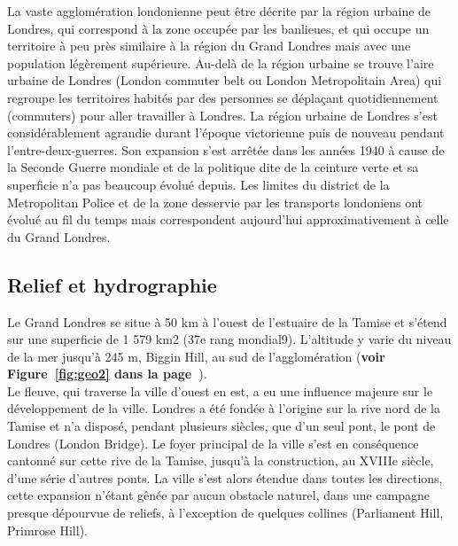 \documentclass{article}
\begin{document}
La vaste agglomération londonienne peut être décrite par la région urbaine de Londres, qui correspond à la zone occupée par les banlieues, et qui occupe un territoire à peu près similaire à la région du Grand Londres mais avec une population légèrement supérieure. Au-delà de la région urbaine se trouve l'aire urbaine de Londres (London commuter belt ou London Metropolitain Area) qui regroupe les territoires habités par des personnes se déplaçant quotidiennement (commuters) pour aller travailler à Londres. La région urbaine de Londres s'est considérablement agrandie durant l'époque victorienne puis de nouveau pendant l'entre-deux-guerres. Son expansion s'est arrêtée dans les années 1940 à cause de la Seconde Guerre mondiale et de la politique dite de la ceinture verte et sa superficie n'a pas beaucoup évolué depuis. Les limites du district de la Metropolitan Police et de la zone desservie par les transports londoniens ont évolué au fil du temps mais correspondent aujourd'hui approximativement à celle du Grand Londres.
\subsection{Relief et hydrographie}
Le Grand Londres se situe à 50 km à l'ouest de l'estuaire de la Tamise et s'étend sur une superficie de 1 579 km2 (37e rang mondial9). L'altitude y varie du niveau de la mer jusqu'à 245 m, Biggin Hill, au sud de l'agglomération (\textbf{voir Figure~\ref{fig:geo2} dans la page~\pageref{fig:geo2}}).\\

Le fleuve, qui traverse la ville d'ouest en est, a eu une influence majeure sur le développement de la ville. Londres a été fondée à l'origine sur la rive nord de la Tamise et n'a disposé, pendant plusieurs siècles, que d'un seul pont, le pont de Londres (London Bridge). Le foyer principal de la ville s'est en conséquence cantonné sur cette rive de la Tamise, jusqu'à la construction, au XVIIIe siècle, d'une série d'autres ponts. La ville s'est alors étendue dans toutes les directions, cette expansion n'étant gênée par aucun obstacle naturel, dans une campagne presque dépourvue de reliefs, à l'exception de quelques collines (Parliament Hill, Primrose Hill).
\newpage
\end{document}
